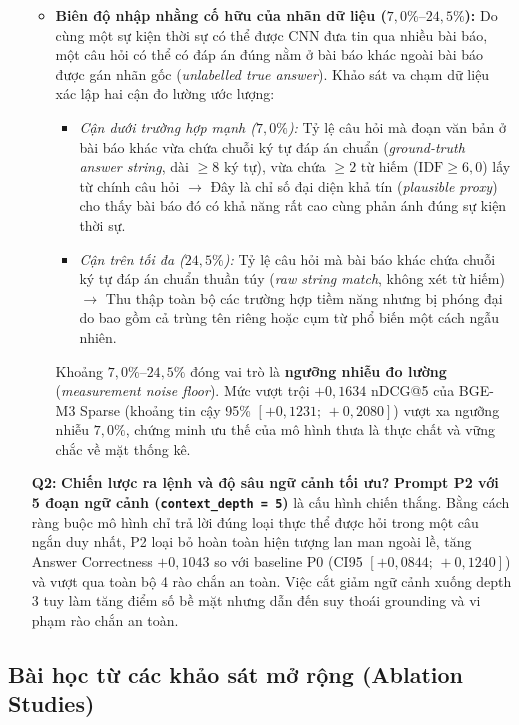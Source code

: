 \begin{enumerate}
\begin{itemize}
    \item \textbf{Biên độ nhập nhằng cố hữu của nhãn dữ liệu ($7{,}0\%\text{--}24{,}5\%$):} Do cùng một sự kiện thời sự có thể được CNN đưa tin qua nhiều bài báo, một câu hỏi có thể có đáp án đúng nằm ở bài báo khác ngoài bài báo được gán nhãn gốc (\textit{unlabelled true answer}). Khảo sát va chạm dữ liệu xác lập hai cận đo lường ước lượng:
    \begin{itemize}
      \item \textit{Cận dưới trường hợp mạnh ($7{,}0\%$):} Tỷ lệ câu hỏi mà đoạn văn bản ở bài báo khác vừa chứa chuỗi ký tự đáp án chuẩn (\textit{ground-truth answer string}, dài $\ge 8$ ký tự), vừa chứa $\ge 2$ từ hiếm ($\text{IDF} \ge 6{,}0$) lấy từ chính câu hỏi $\rightarrow$ Đây là chỉ số đại diện khả tín (\textit{plausible proxy}) cho thấy bài báo đó có khả năng rất cao cùng phản ánh đúng sự kiện thời sự.
      \item \textit{Cận trên tối đa ($24{,}5\%$):} Tỷ lệ câu hỏi mà bài báo khác chứa chuỗi ký tự đáp án chuẩn thuần túy (\textit{raw string match}, không xét từ hiếm) $\rightarrow$ Thu thập toàn bộ các trường hợp tiềm năng nhưng bị phóng đại do bao gồm cả trùng tên riêng hoặc cụm từ phổ biến một cách ngẫu nhiên.
    \end{itemize}
    Khoảng $7{,}0\%\text{--}24{,}5\%$ đóng vai trò là \textbf{ngưỡng nhiễu đo lường} (\textit{measurement noise floor}). Mức vượt trội $+0{,}1634$ nDCG@5 của BGE-M3 Sparse (khoảng tin cậy 95\% $[+0{,}1231;\,+0{,}2080]$) vượt xa ngưỡng nhiễu $7{,}0\%$, chứng minh ưu thế của mô hình thưa là thực chất và vững chắc về mặt thống kê.
  \end{itemize}

  \item[\textbf{Q2:}] \textbf{Chiến lược ra lệnh và độ sâu ngữ cảnh tối ưu?}
  \textbf{Prompt P2 với 5 đoạn ngữ cảnh (\texttt{context\_depth = 5})} là cấu hình chiến thắng. Bằng cách ràng buộc mô hình chỉ trả lời đúng loại thực thể được hỏi trong một câu ngắn duy nhất, P2 loại bỏ hoàn toàn hiện tượng lan man ngoài lề, tăng Answer Correctness $+0{,}1043$ so với baseline P0 (CI95 $[+0{,}0844;\,+0{,}1240]$) và vượt qua toàn bộ 4 rào chắn an toàn. Việc cắt giảm ngữ cảnh xuống depth 3 tuy làm tăng điểm số bề mặt nhưng dẫn đến suy thoái grounding và vi phạm rào chắn an toàn.
\end{enumerate}

\subsection{Bài học từ các khảo sát mở rộng (Ablation Studies)}

